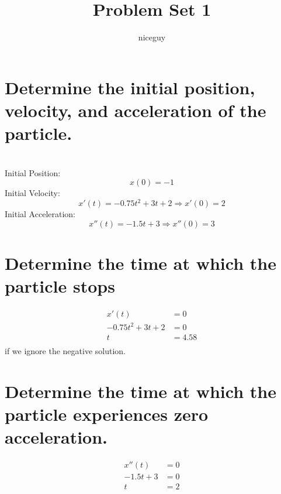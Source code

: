 \documentclass[answers]{exam}
\author{niceguy}
\title{Problem Set 1}
\begin{document}
\maketitle
\begin{questions}

\begin{parts}
	\part{Determine the initial position, velocity, and acceleration of the particle.}
	\begin{solution}
		\\Initial Position:
		$$x(0) = -1$$
		Initial Velocity:
		$$x'(t) = -0.75t^2 + 3t + 2 \Rightarrow x'(0) = 2$$
		Initial Acceleration:
		$$x''(t) = -1.5t + 3 \Rightarrow x''(0) = 3$$
	\end{solution}
	\part{Determine the time at which the particle stops}
	\begin{solution}
		\begin{align*}
			x'(t) &= 0 \\
			-0.75t^2 + 3t + 2 &= 0 \\
			t &= 4.58 \\
		\end{align*}
		if we ignore the negative solution.
	\end{solution}
	\part{Determine the time at which the particle experiences zero acceleration.}
	\begin{solution}
		\begin{align*}
			x''(t) &= 0 \\
			-1.5t + 3 &= 0 \\
			t &= 2 \\
		\end{align*}
	\end{solution}
\end{parts}



\end{questions}
\end{document}
